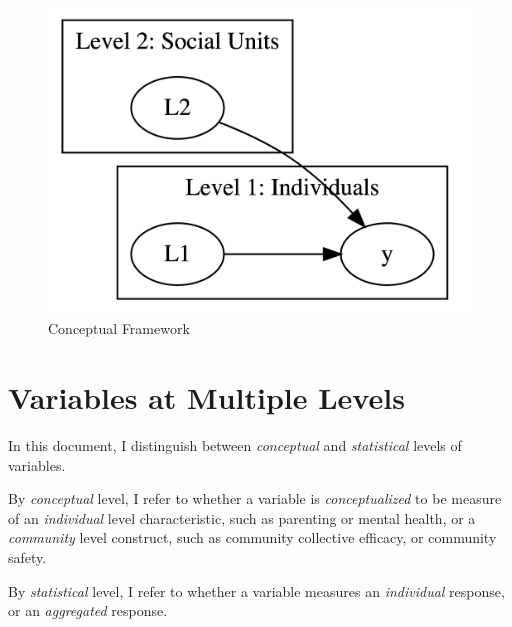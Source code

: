 \documentclass[
  letterpaper,
  DIV=11,
  numbers=noendperiod]{scrreprt}
\begin{document}
\begin{figure}

{\centering \includegraphics[width=5.66in,height=\textheight]{./fig-conceptual.png}

}

\caption{\label{fig-conceptual}Conceptual Framework}

\end{figure}

\hypertarget{sec-levels}{%
\section{Variables at Multiple Levels}\label{sec-levels}}

In this document, I distinguish between \emph{conceptual} and
\emph{statistical} levels of variables.

By \emph{conceptual} level, I refer to whether a variable is
\emph{conceptualized} to be measure of an \emph{individual} level
characteristic, such as parenting or mental health, or a
\emph{community} level construct, such as community collective efficacy,
or community safety.

By \emph{statistical} level, I refer to whether a variable measures an
\emph{individual} response, or an \emph{aggregated} response.
\end{document}
